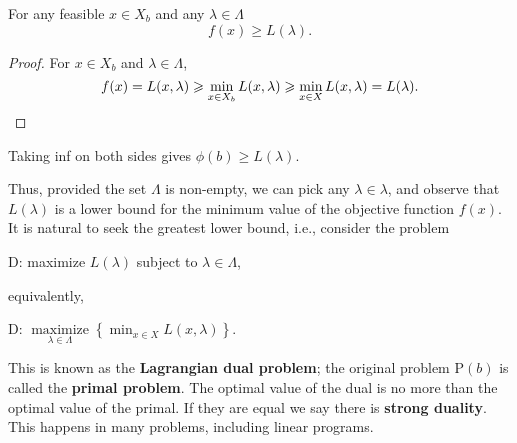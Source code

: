 \begin{theorem}
    For any feasible $x \in X_b$ and any $\lambda \in \Lambda$
    \[
    f(x) \geq L(\lambda).
    \]
\end{theorem}
\begin{proof}
    For $x\in X_b$ and $ \lambda\in \Lambda $, 
    \[
        f(x) = L(x,\lambda) \ge \min_{x\in X_b} L(x,\lambda) \ge \min_{x\in X}L(x,\lambda) = L(\lambda).\qedhere
    \]
\end{proof}
\begin{note}
    Taking inf on both sides gives $ \phi(b)\ge L(\lambda) $. 
\end{note}
Thus, provided the set $\Lambda$ is non-empty, we can pick any $\lambda \in \lambda$, and observe that $L(\lambda)$ is a lower bound for the minimum value of the objective function $f(x)$. It is natural to seek the greatest lower bound, i.e., consider the problem
\begin{center}
    D: maximize $L(\lambda)$ subject to $\lambda \in \Lambda$,
\end{center}
equivalently,
\begin{center}
    D: $\underset{\lambda \in \Lambda}{\operatorname{maximize}}\left\{\min _{x \in X} L(x, \lambda)\right\}$.
\end{center}
This is known as the \textbf{Lagrangian dual problem}; the original problem $\mathrm{P}(b)$ is called the \textbf{primal problem}. The optimal value of the dual is no more than the optimal value of the primal. If they are equal we say there is \textbf{strong duality}. This happens in many problems, including linear programs.

